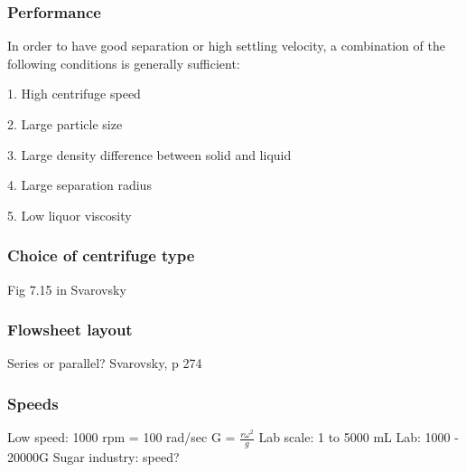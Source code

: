 \begin{frame}\frametitle{Performance}
	
	In order to have good separation or high settling velocity, a combination of the following conditions is generally sufficient:

	1. High centrifuge speed

	2. Large particle size

	3. Large density difference between solid and liquid

	4. Large separation radius

	5. Low liquor viscosity
	
	
\end{frame}

\begin{frame}\frametitle{Choice of centrifuge type}
	Fig 7.15 in Svarovsky
\end{frame}

\begin{frame}\frametitle{Flowsheet layout}
	Series or parallel? Svarovsky, p 274
\end{frame}

\begin{frame}\frametitle{Speeds}
	Low speed: 1000 rpm = 100 rad/sec
	G  = $\frac{r\omega^2}{g}$
	Lab scale: 1 to 5000 mL
	Lab: 1000 - 20000G	
	Sugar industry: speed?
\end{frame}

